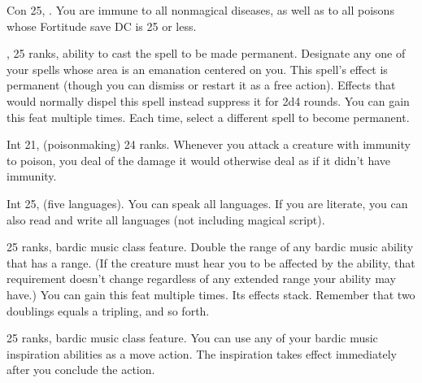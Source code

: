 {Con 25, .}
{You are immune to all nonmagical diseases, as well as to all poisons whose Fortitude save DC is 25 or less.}

{}
{,  25 ranks, ability to cast the spell to be made permanent.}
{Designate any one of your spells whose area is an emanation centered on you. This spell's effect is permanent (though you can dismiss or restart it as a free action). Effects that would normally dispel this spell instead suppress it for 2d4 rounds.}
{}{You can gain this feat multiple times. Each time, select a different spell to become permanent.}

{Int 21,  (poisonmaking) 24 ranks.}
{Whenever you attack a creature with immunity to poison, you deal \onehalf of the damage it would otherwise deal as if it didn't have immunity.}

{Int 25,  (five languages).}
{You can speak all languages. If you are literate, you can also read and write all languages (not including magical script).}

{}
{ 25 ranks, bardic music class feature.}
{Double the range of any bardic music ability that has a range. (If the creature must hear you to be affected by the ability, that requirement doesn’t change regardless of any extended range your ability may have.)}
{}{You can gain this feat multiple times. Its effects stack. Remember that two doublings equals a tripling, and so forth.}

{ 25 ranks, bardic music class feature.}
{You can use any of your bardic music inspiration abilities as a move action. The inspiration takes effect immediately after you conclude the action.}